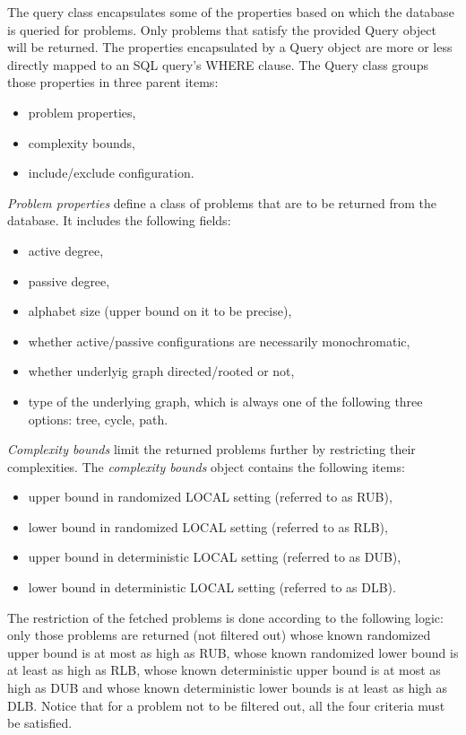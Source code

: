 The query class encapsulates some of the properties
based on which the database is queried for problems.
Only problems that satisfy the provided Query object will be
returned. The properties encapsulated by a Query object are
more or less directly mapped to an SQL query's WHERE clause.
The Query class groups those properties in three parent items:

\begin{itemize}
  \item problem properties,
  \item complexity bounds,
  \item include/exclude configuration.
\end{itemize}

\emph{Problem properties} define a class of problems that are to be
returned from the database. It includes the following fields:

\begin{itemize}
  \item active degree,
  \item passive degree,
  \item alphabet size (upper bound on it to be precise),
  \item whether active/passive configurations are necessarily monochromatic,
  \item whether underlyig graph directed/rooted or not,
  \item type of the underlying graph, which is always one of the following three
  options: tree, cycle, path.
\end{itemize}

\emph{Complexity bounds} limit the returned problems further by
restricting their complexities. The \emph{complexity bounds} object
contains the following items:

\begin{itemize}
  \item upper bound in randomized LOCAL setting (referred to as RUB),
  \item lower bound in randomized LOCAL setting (referred to as RLB),
  \item upper bound in deterministic LOCAL setting (referred to as DUB),
  \item lower bound in deterministic LOCAL setting (referred to as DLB).
\end{itemize}

The restriction of the fetched problems is done according to the
following logic: only those problems are returned (not filtered out)
whose known randomized upper bound is at most as high as RUB, whose
known randomized lower bound is at least as high as RLB, whose
known deterministic upper bound is at most as high as DUB and whose
known deterministic lower bounds is at least as high as DLB. Notice that
for a problem not to be filtered out, all the four criteria must be
satisfied.

